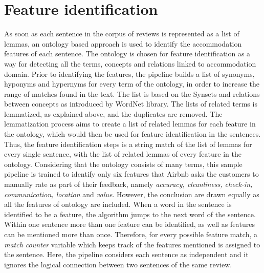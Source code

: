 \section{Feature identification}
As soon as each sentence in the corpus of reviews is represented as a list of lemmas, an ontology based approach is used to identify the accommodation features of each sentence. The ontology is chosen for feature identification as a way for detecting all the terms, concepts and relations linked to accommodation domain. Prior to identifying the features, the pipeline builds a list of synonyms, hyponyms and hypernyms for every term of the ontology, in order to increase the range of matches found in the text. The list is based on the Synsets and relations between concepts as introduced by WordNet library. The lists of related terms is lemmatized, as explained above, and the duplicates are removed. The lemmatization process aims to create a list of related lemmas for each feature in the ontology, which would then be used for feature identification in the sentences.
Thus, the feature identification steps is a string match of the list of lemmas for every single sentence, with the list of related lemmas of every feature in the ontology. Considering that the ontology consists of many terms, this sample pipeline is trained to identify only six features that Airbnb asks the customers to manually rate as part of their feedback, namely \textit{accuracy, cleanliness, check-in, communication, location} and \textit{value}. However, the conclusion are drawn equally as all the features of ontology are included.
When a word in the sentence is identified to be a feature, the algorithm jumps to the next word of the sentence. Within one sentence more than one feature can be identified, as well as features can be mentioned more than once. Therefore, for every possible feature match, a\textit{ match counter } variable which keeps track of the features mentioned is assigned to the sentence. Here, the pipeline considers each sentence as independent and it ignores the logical connection between two sentences of the same review.

